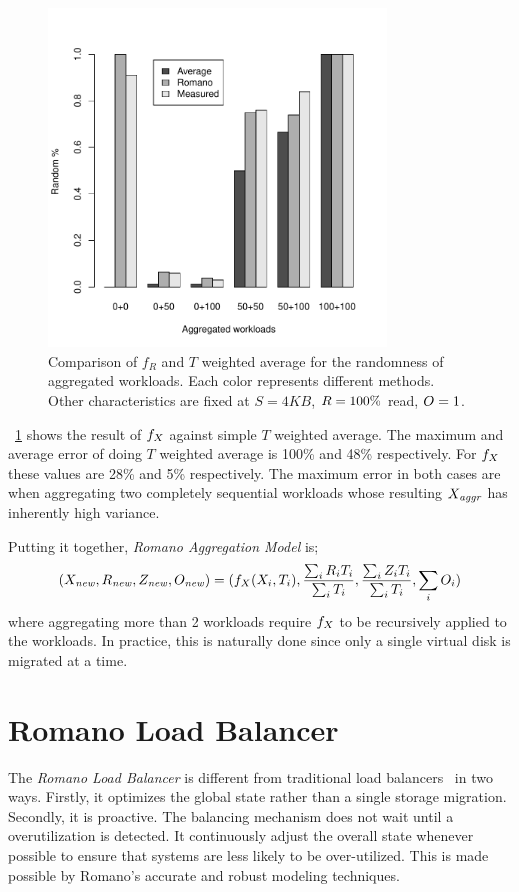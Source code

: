 \begin{figure}[!t]
\centering
\includegraphics[width=0.8\textwidth]{figure/random_accuracy.pdf}
\captionsetup{format=myformat}
\caption{Comparison of $f_R$ and $T$ weighted average for the randomness of aggregated workloads.
Each color represents different methods.
Other characteristics are fixed at $S=4\mathit{KB}$, $R=100\%$ read, $O=1$.
}
\label{randmix}
\end{figure}
\figurename~\ref{randmix} shows the result of $f_{X}$ against simple $T$ weighted average.
The maximum and average error of doing $T$ weighted average is 100\% and 48\% respectively.
For $f_{X}$ these values are 28\% and 5\% respectively.
The maximum error in both cases are when aggregating two completely sequential workloads whose resulting ${X}_{\mathit{aggr}}$ has inherently high variance.

Putting it together, \emph{Romano Aggregation Model} is;
\begin{equation}\label{sumFun}
(X_{\mathit{new}}, R_{\mathit{new}}, Z_{\mathit{new}}, O_{\mathit{new}}) \\
  = (f_{X}({X}_i, T_i), \frac{\sum_{i} {R}_i T_i}{\sum_{i} T_i}, \frac{\sum_{i} {Z}_i T_i}{\sum_{i} T_i}, \sum_{i} {O}_i)
\end{equation}
where aggregating more than 2 workloads require $f_{X}$ to be recursively applied to the workloads.
In practice, this is naturally done since only a single virtual disk is migrated at a time.

\section{Romano Load Balancer}
The \emph{Romano Load Balancer} is different from traditional load balancers~\cite{gulati:2010, gulati:2011, singh:2008} in two ways.
Firstly, it optimizes the global state rather than a single storage migration.
Secondly, it is proactive.
The balancing mechanism does not wait until a overutilization is detected.
It continuously adjust the overall state whenever possible to ensure that systems are less likely to be over-utilized.
This is made possible by Romano's accurate and robust modeling techniques.

